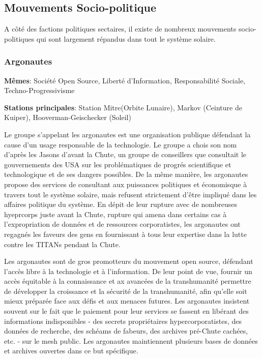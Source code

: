                                     \subsection{Mouvements Socio-politique} \label{sec:socio-polit-movem} 

                                    A côté des factions politiques sectaires, il existe de nombreux mouvements socio-politiques qui sont largement répandus dans tout le système solaire. 

                                    \subsubsection{Argonautes} \label{sec:argonauts} 

                                    \textbf{Mêmes}: Société Open Source, Liberté d'Information, Responsabilité Sociale, Techno-Progressivisme 

                                    \textbf{Stations principales}: Station Mitre(Orbite Lunaire), Markov (Ceinture de Kuiper), Hooverman-Geischecker (Soleil) 

                                    Le groupe s'appelant les argonautes est une organisation publique défendant la cause d'un usage responsable de la technologie. Le groupe a chois son nom d'après les Jasons d'avant la Chute, un groupe de conseillers que consultait le gouvernements des USA sur les problématiques de progrés scientifique et technologique et de ses dangers possibles. De la même manière, les argonautes propose des services de consultant aux puissances politiques et économisque à travers tout le système solaire, mais refusent strictement d'être impliqué dans les affaires politique du système. En dépit de leur rupture avec de nombreuses hyeprcorps juste avant la Chute, rupture qui amena dans certains cas à l'expropriation de données et de ressources corporatistes, les argonautes ont regagnés les faveurs des gens en fournissant à tous leur expertise dans la lutte contre les TITANs pendant la Chute. 

                                    Les argonautes sont de gros promotteurs du mouvement open source, défendant l'accès libre à la technologie et à l'information. De leur point de vue, fournir un accès équitable à la connaissance et ax avancées de la transhumanité permettre de développer la croissance et la sécurité de la transhumanité, afin qu'elle soit mieux préparée face aux défis et aux menaces futures. Les argonautes insistent souvent sur le fait que le paiement pour leur services se fassent en libérant des informations indisponibles - des secrets propriétaires hypercorporatistes, des données de recherche, des schéams de fabeurs, des archives pré-Chute cachées, etc. - sur le mesh public. Les argonautes maintiennent plusieurs bases de données et archives ouvertes dans ce but spécifique. 

